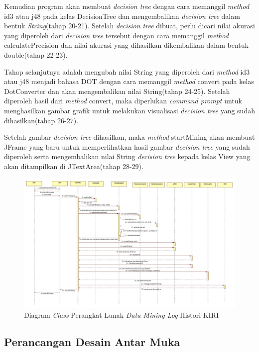 Kemudian program akan membuat \textsl{decision tree} dengan cara memanggil \textsl{method} id3 atau j48 pada kelas DecisionTree dan mengembalikan \textsl{decision tree} dalam bentuk \textsl{String}(tahap 20-21). Setelah \textsl{decision tree} dibuat, perlu dicari nilai akurasi yang diperoleh dari \textsl{decision tree} tersebut dengan cara memanggil \textsl{method} calculatePrecision dan nilai akurasi yang dihasilkan dikembalikan dalam bentuk double(tahap 22-23).

Tahap selanjutnya adalah mengubah nilai String yang diperoleh dari \textsl{method} id3 atau j48 menjadi bahasa DOT dengan cara memanggil \textsl{method} convert pada kelas DotConverter dan akan mengembalikan nilai String(tahap 24-25). Setelah diperoleh hasil dari \textsl{method} convert, maka diperlukan \textsl{command prompt} untuk menghasilkan gambar grafik untuk melakukan visualisasi \textsl{decision tree} yang sudah dihasilkan(tahap 26-27).

Setelah gambar \textsl{decision tree} dihasilkan, maka \textsl{method} startMining akan membuat JFrame yang baru untuk memperlihatkan hasil gambar \textsl{decision tree} yang sudah diperoleh serta mengembalikan nilai String \textsl{decision tree} kepada kelas View yang akan ditampilkan di JTextArea(tahap 28-29).


\begin{figure}[H]
\includegraphics[scale=0.42, angle =90]{Gambar/sequenceDiagram.jpg}
\caption[Diagram \textsl{Class} Perangkat Lunak \textsl{Data Mining Log} Histori KIRI]{Diagram \textsl{Class} Perangkat Lunak \textsl{Data Mining Log} Histori KIRI} 
\label{fig:sequenceDiagram}
\end{figure}

\subsection{Perancangan Desain Antar Muka}

